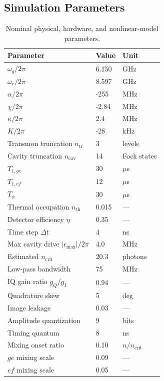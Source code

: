 \documentclass[11pt, a4paper]{article}
\begin{document}
\subsection{Simulation Parameters}
\begin{table}[H]
  \centering
  \caption{Nominal physical, hardware, and nonlinear-model parameters.}
  \begin{tabular}{@{} l l l @{} }
    \toprule
    Parameter & Value & Unit \\
    \midrule
    $\omega_q/2\pi$ & 6.150 & GHz \\
    $\omega_r/2\pi$ & 8.597 & GHz \\
    $\alpha/2\pi$ & -255 & MHz \\
    $\chi/2\pi$ & -2.84 & MHz \\
    $\kappa/2\pi$ & 2.4 & MHz \\
    $K/2\pi$ & -28 & kHz \\
    Transmon truncation $n_{\mathrm{tr}}$ & 3 & levels \\
    Cavity truncation $n_{\mathrm{cav}}$ & 14 & Fock states \\
    $T_{1,ge}$ & 30 & $\mu$s \\
    $T_{1,ef}$ & 12 & $\mu$s \\
    $T_\phi$ & 30 & $\mu$s \\
    Thermal occupation $n_{\mathrm{th}}$ & 0.015 & --- \\
    Detector efficiency $\eta$ & 0.35 & --- \\
    Time step $\Delta t$ & 4 & ns \\
    Max cavity drive $|\epsilon_{\max}|/2\pi$ & 4.0 & MHz \\
    Estimated $n_{\mathrm{crit}}$ & 20.3 & photons \\
    Low-pass bandwidth & 75 & MHz \\
    IQ gain ratio $g_Q/g_I$ & 0.94 & --- \\
    Quadrature skew & 5 & deg \\
    Image leakage & 0.03 & --- \\
    Amplitude quantization & 9 & bits \\
    Timing quantum & 8 & ns \\
    Mixing onset ratio & 0.10 & $n/n_{\mathrm{crit}}$ \\
    $ge$ mixing scale & 0.09 & --- \\
    $ef$ mixing scale & 0.05 & --- \\
    \bottomrule
  \end{tabular}
\end{table}
\end{document}
